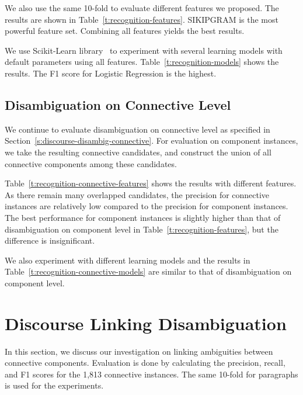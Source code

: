 We also use the same 10-fold to evaluate different features we proposed.
The results are shown in Table~\ref{t:recognition-features}. SIKIPGRAM
is the most powerful feature set. Combining all features yields the best results.



We use Scikit-Learn library~\citep{scikit-learn} to experiment with
several learning models with default parameters using all features.
Table~\ref{t:recognition-models} shows the results. The F1 score for Logistic
Regression is the highest.




\subsection{Disambiguation on Connective Level}

We continue to  evaluate disambiguation on connective level as specified in
Section~\ref{s:discourse-disambig-connective}. For evaluation on component instances,
we take the resulting connective candidates, and construct 
the union of all connective components among these candidates.

Table~\ref{t:recognition-connective-features} shows the results with different features.
As there remain many overlapped candidates, the precision for connective instances
are relatively low compared to the precision for component instances. The best performance
for component instances is slightly higher than that of disambiguation on component level in
Table~\ref{t:recognition-features},
but the difference is insignificant.



We also experiment with different learning models and the results
in Table~\ref{t:recognition-connective-models} are similar to that of disambiguation on
component level.



\section{Discourse Linking Disambiguation}
\label{s:linking-exp}

In this section, we discuss our investigation on linking ambiguities between connective
components. Evaluation is done by calculating the precision, recall, and F1 scores for the
1,813 connective instances.
The same 10-fold for paragraphs is used for the experiments.

